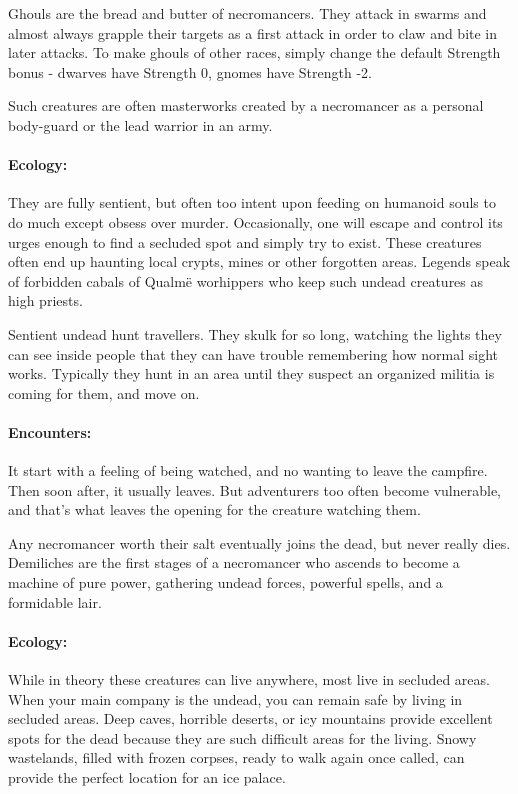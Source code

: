 \label{ghoul}
\ghoul

Ghouls are the bread and butter of necromancers.  They attack in swarms and almost always grapple their targets as a first attack in order to claw and bite in later attacks.  To make ghouls of other races, simply change the default Strength bonus - dwarves have Strength 0, gnomes have Strength -2.

\label{ghast}


Such creatures are often masterworks created by a necromancer as a personal body-guard or the lead warrior in an army.

\ghast

\paragraph{Ecology:} They are fully sentient, but often too intent upon feeding on humanoid souls to do much except obsess over murder.  Occasionally, one will escape and control its urges enough to find a secluded spot and simply try to exist.  These creatures often end up haunting local crypts, mines or other forgotten areas.  Legends speak of forbidden cabals of Qualm\"{e} worhippers who keep such undead creatures as high priests.

Sentient undead hunt travellers.  They skulk for so long, watching the lights they can see inside people that they can have trouble remembering how normal sight works.  Typically they hunt in an area until they suspect an organized militia is coming for them, and move on.

\paragraph{Encounters:}  It start with a feeling of being watched, and no wanting to leave the campfire.  Then soon after, it usually leaves.  But adventurers too often become vulnerable, and that's what leaves the opening for the creature watching them.


\label{demilich}

Any necromancer worth their salt eventually joins the dead, but never really dies.  Demiliches are the first stages of a necromancer who ascends to become a machine of pure power, gathering undead forces, powerful spells, and a formidable lair.

\demilich

\paragraph{Ecology:} While in theory these creatures can live anywhere, most live in secluded areas.  When your main company is the undead, you can remain safe by living in secluded areas.  Deep caves, horrible deserts, or icy mountains provide excellent spots for the dead because they are such difficult areas for the living.  Snowy wastelands, filled with frozen corpses, ready to walk again once called, can provide the perfect location for an ice palace.

